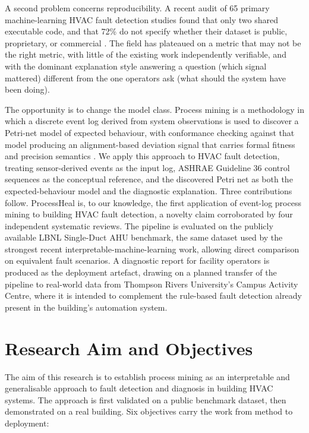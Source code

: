 \documentclass[11pt,letterpaper]{article}
\begin{document}
A second problem concerns reproducibility. A recent audit of 65 primary machine-learning HVAC fault detection studies found that only two shared executable code, and that 72\% do not specify whether their dataset is public, proprietary, or commercial \cite{mukhtar2025reproducibility}. The field has plateaued on a metric that may not be the right metric, with little of the existing work independently verifiable, and with the dominant explanation style answering a question (which signal mattered) different from the one operators ask (what should the system have been doing).

The opportunity is to change the model class. Process mining is a methodology in which a discrete event log derived from system observations is used to discover a Petri-net model of expected behaviour, with conformance checking against that model producing an alignment-based deviation signal that carries formal fitness and precision semantics \cite{vanderaalst2016processmining}. We apply this approach to HVAC fault detection, treating sensor-derived events as the input log, ASHRAE Guideline 36 control sequences as the conceptual reference, and the discovered Petri net as both the expected-behaviour model and the diagnostic explanation. Three contributions follow. ProcessHeal is, to our knowledge, the first application of event-log process mining to building HVAC fault detection, a novelty claim corroborated by four independent systematic reviews. The pipeline is evaluated on the publicly available LBNL Single-Duct AHU benchmark, the same dataset used by the strongest recent interpretable-machine-learning work, allowing direct comparison on equivalent fault scenarios. A diagnostic report for facility operators is produced as the deployment artefact, drawing on a planned transfer of the pipeline to real-world data from Thompson Rivers University's Campus Activity Centre, where it is intended to complement the rule-based fault detection already present in the building's automation system.

\section{Research Aim and Objectives}
\label{sec:aims}

The aim of this research is to establish process mining as an interpretable and generalisable approach to fault detection and diagnosis in building HVAC systems. The approach is first validated on a public benchmark dataset, then demonstrated on a real building. Six objectives carry the work from method to deployment:
\end{document}
